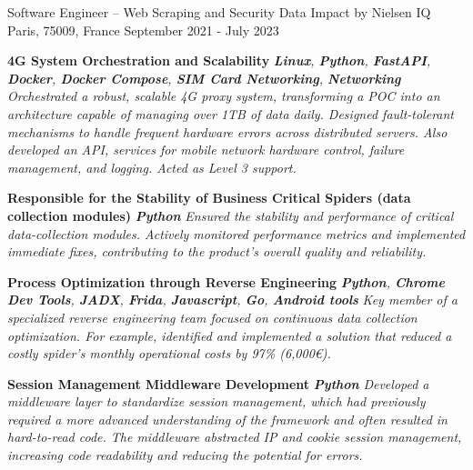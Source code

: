 \begin{cventries}
    \vspace{-1.5 mm}
    \cventry
    {Software Engineer – Web Scraping and Security} %
    {Data Impact by Nielsen IQ} %
    {Paris, 75009, France} %
    {September 2021 - July 2023} %
    {
        \begin{cvitems} %
            \item {
                        \textbf{4G System Orchestration and Scalability} \textbf{\cdotp} \textit{\textbf{Linux}, \textbf{Python}, \textbf{FastAPI}, \textbf{Docker}, \textbf{Docker Compose}, \textbf{SIM Card Networking}, \textbf{Networking}} \textbf{\cdotp} \textit{Orchestrated a robust, scalable 4G proxy system, transforming a POC into an architecture capable of managing over 1TB of data daily. Designed fault-tolerant mechanisms to handle frequent hardware errors across distributed servers. Also developed an API, services for mobile network hardware control, failure management, and logging. Acted as Level 3 support.}
                  }
            \item {
                        \textbf{Responsible for the Stability of Business Critical Spiders (data collection modules)} \textbf{\cdotp} \textit{\textbf{Python}} \textbf{\cdotp} \textit{Ensured the stability and performance of critical data-collection modules. Actively monitored performance metrics and implemented immediate fixes, contributing to the product's overall quality and reliability.}
                  }
            \item {
                        \textbf{Process Optimization through Reverse Engineering} \textbf{\cdotp} \textit{\textbf{Python}, \textbf{Chrome Dev Tools}, \textbf{JADX}, \textbf{Frida}, \textbf{Javascript}, \textbf{Go}, \textbf{Android tools}} \textbf{\cdotp} \textit{Key member of a specialized reverse engineering team focused on continuous data collection optimization. For example, identified and implemented a solution that reduced a costly spider's monthly operational costs by 97\% (6,000€).}
                  }
            \item {
                        \textbf{Session Management Middleware Development} \textbf{\cdotp} \textit{\textbf{Python}} \textbf{\cdotp} \textit{Developed a middleware layer to standardize session management, which had previously required a more advanced understanding of the framework and often resulted in hard-to-read code. The middleware abstracted IP and cookie session management, increasing code readability and reducing the potential for errors.}
}
\end{cvitems}}
\end{cventries}
